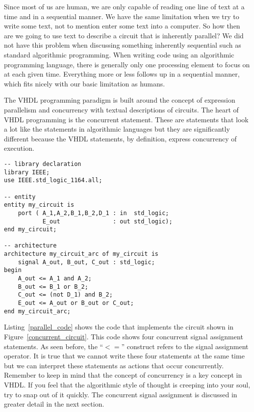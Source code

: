 Since most of us are human, we are only capable of reading one line of text at a time and in a sequential manner. We have the same limitation when we try to write some text, not to mention enter some text into a computer. So how then are we going to use text to describe a circuit that is inherently parallel? We did not have this problem when discussing something inherently sequential such as standard algorithmic programming. When writing code using an algorithmic programming language, there is generally only one processing element to focus on at each given time. Everything more or less follows up in a sequential manner, which fits nicely with our basic limitation as humans.

The VHDL programming paradigm is built around the concept of expression parallelism and concurrency with textual descriptions of circuits. The heart of VHDL programming is the concurrent statement. These are statements that look a lot like the statements in algorithmic languages but they are significantly different because the VHDL statements, by definition, express concurrency of execution.

\begin{lstlisting}[float, label=parallel_code, caption=VHDL code for the circuit of Figure 4.1.]
-- library declaration
library IEEE;
use IEEE.std_logic_1164.all;

-- entity
entity my_circuit is
	port ( A_1,A_2,B_1,B_2,D_1 : in  std_logic;
	       E_out               : out std_logic);
end my_circuit;

-- architecture
architecture my_circuit_arc of my_circuit is
	signal A_out, B_out, C_out : std_logic;
begin
	A_out <= A_1 and A_2;
	B_out <= B_1 or B_2;
	C_out <= (not D_1) and B_2;
	E_out <= A_out or B_out or C_out;
end my_circuit_arc;
\end{lstlisting}

Listing~\ref{parallel_code} shows the code that implements the circuit shown in Figure~\ref{concurrent_circuit}. This code shows four concurrent signal assignment statements. As seen before, the ``$<=$'' construct refers to the signal assignment operator. It is true that we cannot write these four statements at the same time but we can interpret these statements as actions that occur concurrently. Remember to keep in mind that the concept of concurrency is a key concept in VHDL. If you feel that the algorithmic style of thought is creeping into your soul, try to snap out of it quickly. The concurrent signal assignment is discussed in greater detail in the next section.

